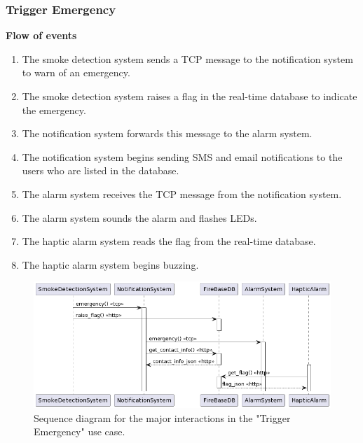 \subsubsection{Trigger Emergency}

\textbf{Flow of events}
\begin{enumerate}
    \item The smoke detection system sends a TCP message to the notification system to warn of an emergency.
    \item The smoke detection system raises a flag in the real-time database to indicate the emergency.
    \item The notification system forwards this message to the alarm system.
    \item The notification system begins sending SMS and email notifications to the users who are listed in the database.
    \item The alarm system receives the TCP message from the notification system.
    \item The alarm system sounds the alarm and flashes LEDs.
    \item The haptic alarm system reads the flag from the real-time database.
    \item The haptic alarm system begins buzzing.
\end{enumerate}

\begin{figure}[H]
    \centering
    \includegraphics[width=\linewidth]{../assets/FANSAlarmUseCaseSequence.png}
    \caption{Sequence diagram for the major interactions in the "Trigger Emergency" use case.}
\end{figure}
